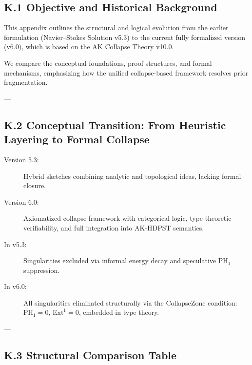 \documentclass[11pt]{article}
\begin{document}
{{\subsection*{K.1 Objective and Historical Background}

This appendix outlines the structural and logical evolution from the earlier formulation  
(Navier–Stokes Solution v5.3) to the current fully formalized version (v6.0),  
which is based on the AK Collapse Theory v10.0.

We compare the conceptual foundations, proof structures, and formal mechanisms,  
emphasizing how the unified collapse-based framework resolves prior fragmentation.

---

\subsection*{K.2 Conceptual Transition: From Heuristic Layering to Formal Collapse}

\begin{description}
  \item[Version 5.3:]  
  Hybrid sketches combining analytic and topological ideas, lacking formal closure.

  \item[Version 6.0:]  
  Axiomatized collapse framework with categorical logic, type-theoretic verifiability,  
  and full integration into AK-HDPST semantics.

  \item[In v5.3:]  
  Singularities excluded via informal energy decay and speculative PH₁ suppression.

  \item[In v6.0:]  
  All singularities eliminated structurally via the CollapseZone condition:  
  \( \mathrm{PH}_1 = 0 \), \( \mathrm{Ext}^1 = 0 \), embedded in type theory.
\end{description}

---

\subsection*{K.3 Structural Comparison Table}

}}
\end{document}
